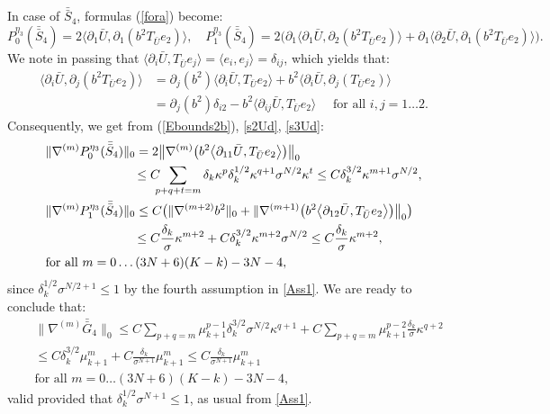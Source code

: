 \documentclass[reqno,twoside,11pt]{amsart}
\newcommand*{\dbar}[1]{\bar{\bar{#1}}}
\numberwithin{equation}{section}
\theoremstyle{plain}
\theoremstyle{definition}
\begin{document}
\smallskip

\noindent In case of $\dbar S_4$, formulas (\ref{fora}) become:
$$P_0^{\eta_3}(\dbar S_4) = 2\langle\partial_1\bar U, \partial_1(b^2
T_{\bar U} e_2)\rangle,  \quad P_1^{\eta_3}(\dbar S_4) = 
2 \Big(\partial_1\langle\partial_1\bar U, \partial_2(b^2 T_{\bar U} e_2)\rangle 
+ \partial_1\langle\partial_2\bar U, \partial_1(b^2 T_{\bar U} e_2)\rangle\Big).$$
We note in passing that $\langle \partial_i\bar U, T_{\bar
  U}e_j\rangle = \langle e_i, e_j\rangle = \delta_{ij}$, which yields that:
\begin{equation*}
\begin{split}
 \big\langle \partial_i \bar U, \partial_j(b^2 T_{\bar U} e_2)\big\rangle
& = \partial_j(b^2) \big\langle \partial_i \bar U, T_{\bar U} e_2\big\rangle
+ b^2 \big\langle \partial_i \bar U, \partial_j(T_{\bar U} e_2)\big\rangle
\\ & = \partial_j(b^2) \delta_{i2} 
- b^2 \big\langle \partial_{ij} \bar U, T_{\bar U} e_2\big\rangle
\quad\mbox{ for all } i,j=1\ldots 2.
\end{split}
\end{equation*}
Consequently, we get from (\ref{Ebounds2b}), \ref{s2Ud}, \ref{s3Ud}:
\begin{equation*}
\begin{split}
&\|\nabla^{(m)}P_0^{\eta_3}(\dbar S_4)\|_0 = 2\big\|\nabla^{(m)}\big(b^2
\big\langle \partial_{11} \bar U, T_{\bar U}
e_2\big\rangle\big)\big\|_0 \\ & \qquad\qquad\qquad \quad \leq 
C\hspace{-2mm} \sum_{p+q+t=m} \vspace{-3mm}
\delta_k\kappa^p\delta_{k}^{1/2}\kappa^{q+1}\sigma^{N/2}\kappa^t\leq 
C \delta_k^{3/2}\kappa^{m+1}\sigma^{N/2},
\\ & \|\nabla^{(m)}P_1^{\eta_3}(\dbar S_4)\|_0\leq
C\big( \|\nabla^{(m+2)} b^2\|_0+
\|\nabla^{(m+1)}\big(b^2\big\langle \partial_{12} \bar U, T_{\bar U}
e_2\big\rangle\big)\big\|_0 \big) \\ &\qquad\qquad\qquad\quad
\leq C\frac{\delta_k}{\sigma}\kappa^{m+2} + C \delta_k^{3/2}\kappa^{m+2}\sigma^{N/2}
\leq C\frac{\delta_k}{\sigma}\kappa^{m+2},
\\ & \mbox{for all } m=0\ldots (3N+6)(K-k)-3N-4,
\end{split}
\end{equation*}
since $\delta_k^{1/2}\sigma^{N/2+1}\leq 1$ by the fourth assumption in \ref{Ass1}.
We are ready to conclude that:
\begin{equation}\label{dbG4}
\begin{split}
& \|\nabla^{(m)}\dbar G_4\|_0 \leq C \sum_{p+q=m}
\mu_{k+1}^{p-1}\delta_k^{3/2}\sigma^{N/2}\kappa^{q+1} + C \sum_{p+q=m}
\mu_{k+1}^{p-2}\frac{\delta_k}{\sigma}\kappa^{q+2} 
 \\ & \leq  C \delta_k^{3/2}\mu_{k+1}^m  + C\frac{\delta_k}{\sigma^{N+1}}\mu_{k+1}^m\leq
C \frac{\delta_k}{\sigma^{N+1}}\mu_{k+1}^m  \\ & \mbox{for all }m=0\ldots (3N+6)(K-k)-3N-4,
\end{split}
\end{equation}
valid provided that $\delta_k^{1/2}\sigma^{N+1}\leq 1$, as usual from  \ref{Ass1}. 
\end{document}
